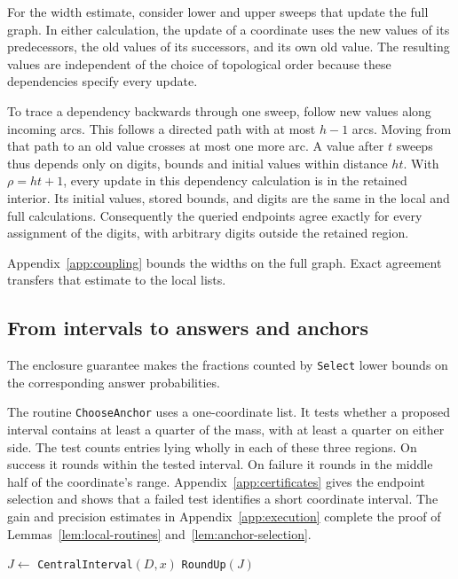 For the width estimate, consider lower and upper sweeps that update the
full graph. In either calculation, the update of a coordinate uses the
new values of its predecessors, the old values of its successors, and
its own old value. The resulting values are independent of the choice
of topological order because these dependencies specify every update.

To trace a dependency backwards through one sweep, follow new values
along incoming arcs. This follows a directed path with at most $h-1$
arcs. Moving from that path to an old value crosses at most one more
arc. A value after $t$ sweeps thus depends only on digits, bounds and
initial values within distance $ht$. With $\rho=ht+1$, every update
in this dependency calculation is in the retained interior. Its initial
values, stored bounds, and digits are the same in the local and full
calculations. Consequently the queried endpoints agree exactly for
every assignment of the digits, with arbitrary digits outside the
retained region.

Appendix~\ref{app:coupling} bounds the widths on the full graph.
Exact agreement transfers that estimate to the local lists.

\subsection{From intervals to answers and anchors}

The enclosure guarantee makes the fractions counted by \texttt{Select}
lower bounds on the corresponding answer probabilities.

The routine \texttt{ChooseAnchor} uses a one-coordinate list. It tests
whether a proposed interval contains at least a quarter of the mass,
with at least a quarter on either side. The test counts entries lying
wholly in each of these three regions. On success it rounds within the
tested interval. On failure it rounds in the middle half of the
coordinate's range. Appendix~\ref{app:certificates} gives the endpoint
selection and shows that a failed test identifies a short coordinate
interval. The gain and precision estimates in
Appendix~\ref{app:execution} complete the proof of
Lemmas~\ref{lem:local-routines} and~\ref{lem:anchor-selection}.

\begin{algorithm}[H]
\caption{\texttt{ChooseAnchor}$(D,x)$: choose an interior position.}
\label{alg:choose-anchor}
\DontPrintSemicolon
{}
$J\gets$ \texttt{CentralInterval}$(D,x)$\;
\Return \texttt{RoundUp}$(J)$\;
\end{algorithm}
